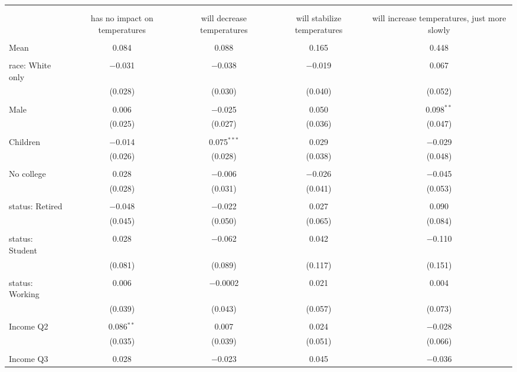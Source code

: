 
\begin{tabular}{@{\extracolsep{5pt}}lcccc} 
\\[-1.8ex]\hline 
\hline \\[-1.8ex] 
\\[-1.8ex] & has no impact on temperatures & will decrease temperatures & will stabilize temperatures & will increase temperatures, just more slowly \\ 
\hline \\[-1.8ex] 
 Mean & 0.084 & 0.088 & 0.165 & 0.448  \\ \hline \\[-1.8ex] race: White only & $-$0.031 & $-$0.038 & $-$0.019 & 0.067 \\ 
  & (0.028) & (0.030) & (0.040) & (0.052) \\ 
  & & & & \\ 
 Male & 0.006 & $-$0.025 & 0.050 & 0.098$^{**}$ \\ 
  & (0.025) & (0.027) & (0.036) & (0.047) \\ 
  & & & & \\ 
 Children & $-$0.014 & 0.075$^{***}$ & 0.029 & $-$0.029 \\ 
  & (0.026) & (0.028) & (0.038) & (0.048) \\ 
  & & & & \\ 
 No college & 0.028 & $-$0.006 & $-$0.026 & $-$0.045 \\ 
  & (0.028) & (0.031) & (0.041) & (0.053) \\ 
  & & & & \\ 
 status: Retired & $-$0.048 & $-$0.022 & 0.027 & 0.090 \\ 
  & (0.045) & (0.050) & (0.065) & (0.084) \\ 
  & & & & \\ 
 status: Student & 0.028 & $-$0.062 & 0.042 & $-$0.110 \\ 
  & (0.081) & (0.089) & (0.117) & (0.151) \\ 
  & & & & \\ 
 status: Working & 0.006 & $-$0.0002 & 0.021 & 0.004 \\ 
  & (0.039) & (0.043) & (0.057) & (0.073) \\ 
  & & & & \\ 
 Income Q2 & 0.086$^{**}$ & 0.007 & 0.024 & $-$0.028 \\ 
  & (0.035) & (0.039) & (0.051) & (0.066) \\ 
  & & & & \\ 
 Income Q3 & 0.028 & $-$0.023 & 0.045 & $-$0.036 \\ 

\end{tabular}
